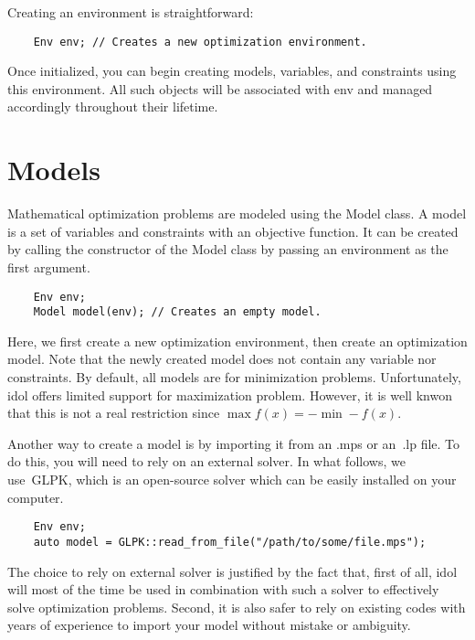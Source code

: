 Creating an environment is straightforward:
%
\begin{lstlisting}
    Env env; // Creates a new optimization environment.
\end{lstlisting}

Once initialized, you can begin creating models, variables, and constraints
using this environment. All such objects will be associated with \textsf{env}
and managed accordingly throughout their lifetime.

\section{Models}

Mathematical optimization problems are modeled using the \textsf{Model} class.
A model is a set of variables and constraints with an objective function. It
can be created by calling the constructor of the \textsf{Model} class by
passing an environment as the first argument.

\begin{lstlisting}
    Env env;
    Model model(env); // Creates an empty model.
\end{lstlisting}

Here, we first create a new optimization environment, then create an
optimization model. Note that the newly created model does not contain any
variable nor constraints. By default, all models are for minimization
problems. Unfortunately, idol offers limited support for maximization problem.
However, it is well knwon that this is not a real restriction since $\max f(x)
= - \min -f(x)$. 

Another way to create a model is by importing it from an \textsf{.mps} or
an~\textsf{.lp} file. To do this, you will need to rely on an external solver.
In what follows, we use~\textsf{GLPK}, which is an open-source solver which
can be easily installed on your computer.

\begin{lstlisting}
    Env env;
    auto model = GLPK::read_from_file("/path/to/some/file.mps");
\end{lstlisting}

The choice to rely on external solver is justified by the fact that, first of
all, \textsf{idol} will most of the time be used in combination with such a
solver to effectively solve optimization problems. Second, it is also safer to
rely on existing codes with years of experience to import your model without
mistake or ambiguity.

